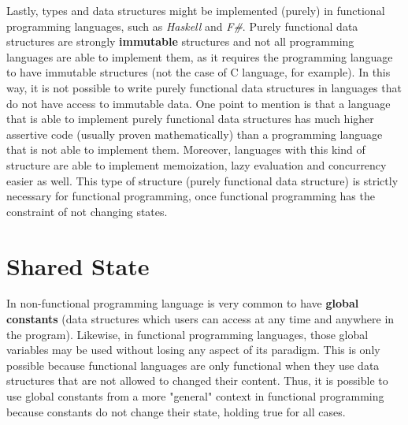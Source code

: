 \documentclass[conference]{IEEEtran}
\begin{document}
Lastly, types and data structures might be implemented (purely) in functional programming languages, such as \textit{Haskell} and \textit{F\#}. Purely functional data structures are strongly \textbf{immutable} structures and not all programming languages are able to implement them, as it requires the programming language to have immutable structures (not the case of C language, for example). In this way, it is not possible to write purely functional data structures in languages that do not have access to immutable data. One point to mention is that a language that is able to implement purely functional data structures has much higher assertive code (usually proven mathematically) than a programming language that is not able to implement them. Moreover, languages with this kind of structure are able to implement memoization, lazy evaluation and concurrency easier as well. This type of structure (purely functional data structure) is strictly necessary for functional programming, once functional programming has the constraint of not changing states.  
\section{Shared State}
In non-functional programming language is very common to have \textbf{global constants} (data structures which users can access at any time and anywhere in the program). Likewise, in functional programming languages, those global variables may be used without losing any aspect of its paradigm. This is only possible because functional languages are only functional when they use data structures that are not allowed to changed their content. Thus, it is possible to use global constants from a more "general" context in functional programming because constants do not change their state, holding true for all cases.  
\end{document}
